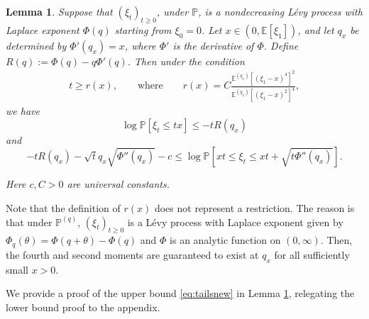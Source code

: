 \documentclass[a4,12pt]{amsart}
\numberwithin{equation}{section}
\newtheorem{lemma}[thm]{Lemma}
\begin{document}
\begin{lemma} \label{lem:tailsnew}
	Suppose that $(\xi_t)_{t \geq 0}$, under $\mathbb{P}$, is a nondecreasing L\'evy process with Laplace 
		exponent $\Phi(q)$ starting from $\xi_0 = 0$. Let $x\in\left(0, \mathbb{E}[\xi_1]\right)$, and let $q_x$ be determined 
		by $\Phi'(q_x) = x$, where $\Phi'$ is the derivative of $\Phi$. Define $R(q) := \Phi(q) - q \Phi'(q)$. Then under the condition
        \begin{align} \label{eq:tailscondition} 
 		t \geq r(x), \qquad \text{where}\qquad  
		r(x) = C  \frac{ \mathbb{E}^{(q_x)}[ (\xi_1 - x)^4 ]^2 }{\mathbb{E}^{(q_x)}[ (\xi_1 - x)^2 ]^4 },
        \end{align} 
         we have 
         \begin{equation} \label{eq:tailsnew}
  \log \mathbb{P}[ \xi_t \leq t x] \leq  - tR(q_x)
   \end{equation} 
   and
        \begin{equation} \label{eq:tailsnew2}
         - t R(q_x) - \sqrt{t} q_x \sqrt{\Phi''(q_x)}  - c \leq  
	 \log \mathbb{P}\left[xt\leq \xi_t \leq  xt + \sqrt{t\Phi''(q_x)}\right].
        \end{equation}
   
        Here $c, C > 0$ are universal constants. 
\end{lemma}
	Note that the definition of $r(x)$ does not represent a restriction. 
	The reason is that  under $\mathbb{P}^{(q)}$, $(\xi_t)_{t\geq 0}$ is a L\'evy process with 
	Laplace exponent given by $\Phi_q(\theta) = \Phi(q+\theta) - \Phi(q)$ and $\Phi$ 
	is an analytic function on $(0,\infty)$. Then, the fourth and second moments are guaranteed to exist at $q_x$ for all sufficiently small $x > 0$. 
    
We provide a proof of the upper bound \eqref{eq:tailsnew} in Lemma \ref{lem:tailsnew}, relegating the lower bound proof to the appendix. 
\end{document}
